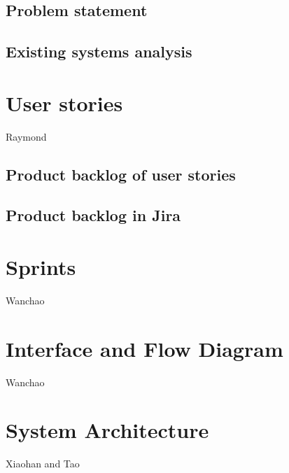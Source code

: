 \documentclass[12pt]{article}
\begin{document}
\subsection{Problem statement}
\subsection{Existing systems analysis}

\newpage
\section{User stories}
Raymond
\subsection{Product backlog of user stories}
\subsection{Product backlog in Jira}

\newpage
\section{Sprints}
Wanchao

\newpage
\section{Interface and Flow Diagram}
Wanchao

\newpage
\section{System Architecture}
Xiaohan and Tao
\end{document}

